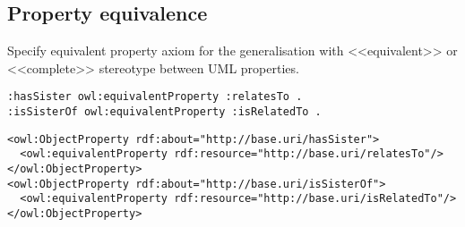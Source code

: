 \subsection{Property equivalence}

\begin{trule}
	\label{rule:equivalent-properties-rc}
	Specify equivalent property axiom for the generalisation with <<equivalent>> or <<complete>> stereotype between UML properties.
\end{trule}

\vspace{-\parskip}
\begin{minipage}[b]{.385\textwidth}
\begin{lstlisting}[language=Turtle, caption={Property equivalence in Turtle syntax}, captionpos=b]
:hasSister owl:equivalentProperty :relatesTo .
:isSisterOf owl:equivalentProperty :isRelatedTo .
\end{lstlisting}
\end{minipage}%
\quad\vspace{-\parskip}
\begin{minipage}[b]{.56\textwidth}
\begin{lstlisting}[language=RDF/XML, caption={Property equivalence in RDF/XML syntax}, captionpos=b]
<owl:ObjectProperty rdf:about="http://base.uri/hasSister">
  <owl:equivalentProperty rdf:resource="http://base.uri/relatesTo"/>
</owl:ObjectProperty>
<owl:ObjectProperty rdf:about="http://base.uri/isSisterOf">
  <owl:equivalentProperty rdf:resource="http://base.uri/isRelatedTo"/>
</owl:ObjectProperty>
\end{lstlisting}
\end{minipage}
\vspace{-\parskip}

